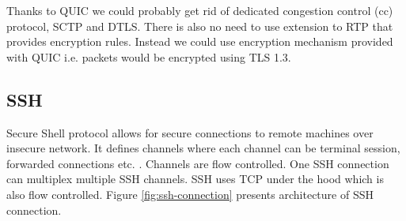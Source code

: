
Thanks to QUIC we could probably get rid of dedicated congestion control (cc) protocol, SCTP and DTLS. 
There is also no need to use extension to RTP that provides encryption rules.
Instead we could use encryption mechanism provided with QUIC i.e. packets would be encrypted using TLS 1.3.

\subsection{SSH}
Secure Shell protocol allows for secure connections to remote machines over insecure network. 
It defines channels where each channel can be terminal session, forwarded connections etc. \cite{rfc4254}.
Channels are flow controlled.
One SSH connection can multiplex multiple SSH channels.
SSH uses TCP under the hood which is also flow controlled.
Figure \ref{fig:ssh-connection} presents architecture of SSH connection.

